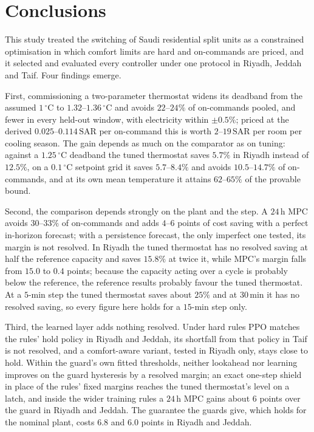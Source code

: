\documentclass[3p,twocolumn,number]{elsarticle}
\newcommand{\SAR}{\text{SAR}}
\begin{document}
\section{Conclusions}
\label{sec:conclusion}

This study treated the switching of Saudi residential split units as a constrained optimisation in which comfort limits are hard and on-commands are priced, and it selected and evaluated every controller under one protocol in Riyadh, Jeddah and Taif. Four findings emerge.

First, commissioning a two-parameter thermostat widens its deadband from the assumed $1\,^\circ$C to $1.32$--$1.36\,^\circ$C and avoids $22$--$24\%$ of on-commands pooled, and fewer in every held-out window, with electricity within $\pm0.5\%$; priced at the derived $0.025$--$0.114\,\SAR$ per on-command this is worth $2$--$19\,\SAR$ per room per cooling season. The gain depends as much on the comparator as on tuning: against a $1.25\,^\circ$C deadband the tuned thermostat saves $5.7\%$ in Riyadh instead of $12.5\%$, on a $0.1\,^\circ$C setpoint grid it saves $5.7$--$8.4\%$ and avoids $10.5$--$14.7\%$ of on-commands, and at its own mean temperature it attains $62$--$65\%$ of the provable bound.

Second, the comparison depends strongly on the plant and the step. A $24\,$h MPC avoids $30$--$33\%$ of on-commands and adds $4$--$6$ points of cost saving with a perfect in-horizon forecast; with a persistence forecast, the only imperfect one tested, its margin is not resolved. In Riyadh the tuned thermostat has no resolved saving at half the reference capacity and saves $15.8\%$ at twice it, while MPC's margin falls from $15.0$ to $0.4$ points; because the capacity acting over a cycle is probably below the reference, the reference results probably favour the tuned thermostat. At a $5$-min step the tuned thermostat saves about $25\%$ and at $30\,$min it has no resolved saving, so every figure here holds for a $15$-min step only.

Third, the learned layer adds nothing resolved. Under hard rules PPO matches the rules' hold policy in Riyadh and Jeddah, its shortfall from that policy in Taif is not resolved, and a comfort-aware variant, tested in Riyadh only, stays close to hold. Within the guard's own fitted thresholds, neither lookahead nor learning improves on the guard hysteresis by a resolved margin; an exact one-step shield in place of the rules' fixed margins reaches the tuned thermostat's level on a latch, and inside the wider training rules a $24\,$h MPC gains about $6$ points over the guard in Riyadh and Jeddah. The guarantee the guards give, which holds for the nominal plant, costs $6.8$ and $6.0$ points in Riyadh and Jeddah.
\end{document}
